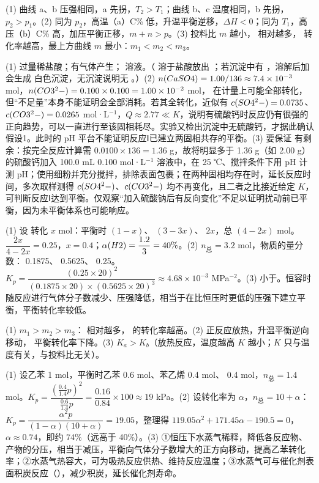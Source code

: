 \begin{jiexilist}
\item (1) 曲线 a、b 压强相同，a 先拐，$T_2>T_1$；曲线 b、c 温度相同，b 先拐，$p_2>p_1$。(2) 同为 $p_2$，高温（a）C\% 低，升温平衡逆移，$\Delta H<0$；同为 $T_1$，高压（b）C\% 高，加压平衡正移，$m+n>p$。(3) 投料比 $m$ 越小， 相对越多， 转化率越高，最上方曲线 $m$ 最小：$m_1<m_2<m_3$。
\item (1) 过量稀盐酸；有气体产生； 溶液。（ 溶于盐酸放出 ；若沉淀中有 ，溶解后加  会生成  白色沉淀，无沉淀说明无 。）(2) $n(CaSO4)=1.00/136\approx7.4\times10^{-3}$ mol，$n(CO3^2-)=0.100\times0.100=1.00\times10^{-2}$ mol， 在计量上可能全部转化，但“不足量”本身不能证明会全部消耗。若其全转化，近似有 $c(SO4^2-)=0.0735$、$c(CO3^2-)=0.0265$ mol·L$^{-1}$，$Q\approx2.77\ll K$，说明有硫酸钙时反应仍有很强的正向趋势，可以一直进行至该固相耗尽。实验又检出沉淀中无硫酸钙，才据此确认假设1。此时的 pH 平台不能证明反应Ⅰ已建立两固相共存的平衡。(3) 要保证  有剩余：按完全反应计算需 $0.0100\times136=1.36$ g，故将明显多于 1.36 g（如 2.00 g）的硫酸钙加入 100.0 mL 0.100 mol·L$^{-1}$  溶液中，在 25 ℃、搅拌条件下用 pH 计测 pH；使用细粉并充分搅拌，排除表面包裹；在两种固相均存在时，延长反应时间，多次取样测得 $c(SO4^2-)$、$c(CO3^2-)$ 均不再变化，且二者之比接近给定 $K$，可判断反应Ⅰ达到平衡。仅观察“加入硫酸钠后有反向变化”不足以证明扰动前已平衡，因为未平衡体系也可能响应。
\item (1) 设  转化 $x$ mol：平衡时  $(1-x)$、 $(3-3x)$、 $2x$，总 $(4-2x)$ mol。$\dfrac{2x}{4-2x}=0.25$，$x=0.4$；$\alpha(H2)=\dfrac{1.2}{3}=40\%$。(2) $n_\text{总}=3.2$ mol，物质的量分数： 0.1875、 0.5625、 0.25。$K_p=\dfrac{(0.25\times20)^2}{(0.1875\times20)\times(0.5625\times20)^3}\approx4.68\times10^{-3}$ MPa$^{-2}$。(3) 小于。恒容时随反应进行气体分子数减少、压强降低，相当于在比恒压时更低的压强下建立平衡，平衡转化率较低。
\item (1) $m_1>m_2>m_3$： 相对越多， 的转化率越高。(2) 正反应放热，升温平衡逆向移动， 平衡转化率下降。(3) $K_a>K_b$（放热反应，温度越高 $K$ 越小；$K$ 只与温度有关，与投料比无关）。
\item (1) 设乙苯 1 mol，平衡时乙苯 0.6 mol、苯乙烯 0.4 mol、 0.4 mol，$n_\text{总}=1.4$ mol。$K_p=\dfrac{(\frac{0.4}{1.4}p)^2}{\frac{0.6}{1.4}p}=\dfrac{0.16}{0.84}\times100\approx19$ kPa。(2) 设转化率为 $\alpha$，$n_\text{总}=10+\alpha$：$K_p=\dfrac{\alpha^2p}{(1-\alpha)(10+\alpha)}=19.05$，整理得 $119.05\alpha^2+171.45\alpha-190.5=0$，$\alpha\approx0.74$，即约 74\%（远高于 40\%）。(3) ①恒压下水蒸气稀释，降低各反应物、产物的分压，相当于减压，平衡向气体分子数增大的正方向移动，提高乙苯转化率；②水蒸气热容大，可为吸热反应供热、维持反应温度；③水蒸气可与催化剂表面积炭反应（），减少积炭，延长催化剂寿命。

\end{jiexilist}
